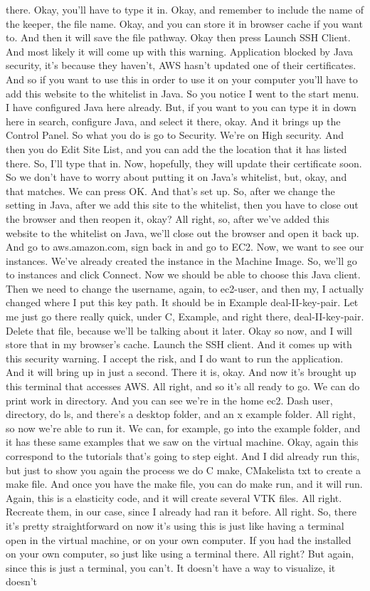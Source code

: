 \documentclass[10pt]{article}
\begin{document}
there. Okay, you'll have to type it in. Okay, and remember to include the name of the keeper, the file name. Okay, and you can store it in browser cache if you want to. And then it will save the file pathway. Okay then press Launch SSH Client. And most likely it will come up with this warning. Application blocked by Java security, it's because they haven't, AWS hasn't updated one of their certificates. And so if you want to use this in order to use it on your computer you'll have to add this website to the whitelist in Java. So you notice I went to the start menu. I have configured Java here already. But, if you want to you can type it in down here in search, configure Java, and select it there, okay. And it brings up the Control Panel. So what you do is go to Security. We're on High security. And then you do Edit Site List, and you can add the the location that it has listed there. So, I'll type that in. Now, hopefully, they will update their certificate soon. So we don't have to worry about putting it on Java's whitelist, but, okay, and that matches. We can press OK. And that's set up. So, after we change the setting in Java, after we add this site to the whitelist, then you have to close out the browser and then reopen it, okay? All right, so, after we've added this website to the whitelist on Java, we'll close out the browser and open it back up. And go to aws.amazon.com, sign back in and go to EC2. Now, we want to see our instances. We've already created the instance in the Machine Image. So, we'll go to instances  and click Connect. Now we should be able to choose this Java client. Then we need to change the username, again, to ec2-user, and then my, I actually changed where I put this key path. It should be in Example deal-II-key-pair. Let me just go there really quick, under C, Example, and right there, deal-II-key-pair. Delete that file, because we'll be talking about it later. Okay so now, and I will store that in my browser's cache. Launch the SSH client.  And it comes up with this security warning. I accept the risk, and I do want to run the application. And it will bring up in just a second. There it is, okay. And now it's brought up this terminal that accesses AWS. All right, and so it's all ready to go. We can do print work in directory. And you can see we're in the home ec2. Dash user, directory, do ls, and there's a desktop folder, and an x example folder. All right, so now we're able to run it. We can, for example, go into the example folder, and it has these same examples that we saw on the virtual machine. Okay, again this correspond to the tutorials that's going to step eight. And I did already run this, but just to show you again the process we do C make, CMakelista txt to create a make file. And once you have the make file, you can do make run, and it will run. Again, this is a elasticity code, and it will create several VTK files. All right. Recreate them, in our case, since I already had ran it before. All right. So, there it's pretty straightforward on now it's using this is just like having a terminal open in the virtual machine, or on your own computer. If you had the installed on your own computer, so just like using a terminal there. All right? But again, since this is just a terminal, you can't. It doesn't have a way to visualize, it doesn't 
\end{document}
